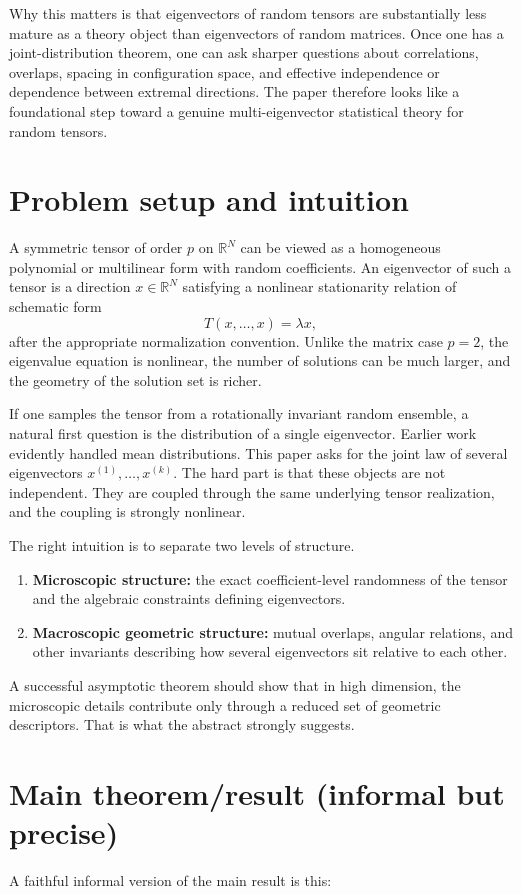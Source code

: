 \documentclass[11pt]{article}
\begin{document}
Why this matters is that eigenvectors of random tensors are substantially less mature as a theory object than eigenvectors of random matrices. Once one has a joint-distribution theorem, one can ask sharper questions about correlations, overlaps, spacing in configuration space, and effective independence or dependence between extremal directions. The paper therefore looks like a foundational step toward a genuine multi-eigenvector statistical theory for random tensors.

\section*{Problem setup and intuition}
A symmetric tensor of order $p$ on $\mathbb{R}^N$ can be viewed as a homogeneous polynomial or multilinear form with random coefficients. An eigenvector of such a tensor is a direction $x \in \mathbb{R}^N$ satisfying a nonlinear stationarity relation of schematic form
\[
T(x,\ldots,x)=\lambda x,
\]
after the appropriate normalization convention. Unlike the matrix case $p=2$, the eigenvalue equation is nonlinear, the number of solutions can be much larger, and the geometry of the solution set is richer.

If one samples the tensor from a rotationally invariant random ensemble, a natural first question is the distribution of a single eigenvector. Earlier work evidently handled mean distributions. This paper asks for the joint law of several eigenvectors $x^{(1)},\dots,x^{(k)}$. The hard part is that these objects are not independent. They are coupled through the same underlying tensor realization, and the coupling is strongly nonlinear.

The right intuition is to separate two levels of structure.
\begin{enumerate}[leftmargin=1.5em]
\item \textbf{Microscopic structure:} the exact coefficient-level randomness of the tensor and the algebraic constraints defining eigenvectors.
\item \textbf{Macroscopic geometric structure:} mutual overlaps, angular relations, and other invariants describing how several eigenvectors sit relative to each other.
\end{enumerate}
A successful asymptotic theorem should show that in high dimension, the microscopic details contribute only through a reduced set of geometric descriptors. That is what the abstract strongly suggests.

\section*{Main theorem/result (informal but precise)}
A faithful informal version of the main result is this:
\end{document}
